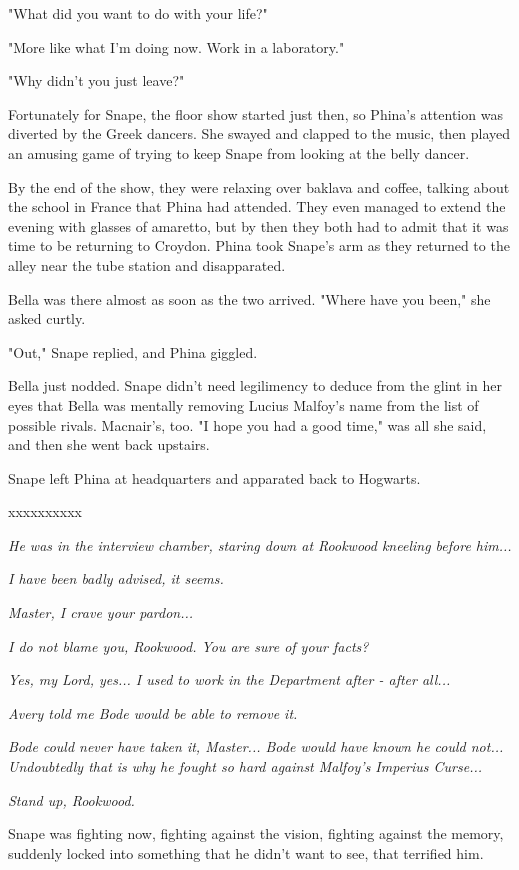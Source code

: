 \documentclass[a4paper,11pt]{article}
\begin{document}
"What did you want to do with your life?"

"More like what I'm doing now. Work in a laboratory."

"Why didn't you just leave?"

Fortunately for Snape, the floor show started just then, so Phina's attention was diverted by the Greek dancers. She swayed and clapped to the music, then played an amusing game of trying to keep Snape from looking at the belly dancer.

By the end of the show, they were relaxing over baklava and coffee, talking about the school in France that Phina had attended. They even managed to extend the evening with glasses of amaretto, but by then they both had to admit that it was time to be returning to Croydon. Phina took Snape's arm as they returned to the alley near the tube station and disapparated.

Bella was there almost as soon as the two arrived. "Where have you been," she asked curtly.

"Out," Snape replied, and Phina giggled.

Bella just nodded. Snape didn't need legilimency to deduce from the glint in her eyes that Bella was mentally removing Lucius Malfoy's name from the list of possible rivals. Macnair's, too. "I hope you had a good time," was all she said, and then she went back upstairs.

Snape left Phina at headquarters and apparated back to Hogwarts.

xxxxxxxxxx

\emph{He was in the interview chamber, staring down at Rookwood kneeling before him...}

\emph{I have been badly advised, it seems.}

\emph{Master, I crave your pardon...}

\emph{I do not blame you, Rookwood. You are sure of your facts?}

\emph{Yes, my Lord, yes... I used to work in the Department after - after all...}

\emph{Avery told me Bode would be able to remove it.}

\emph{Bode could never have taken it, Master... Bode would have known he could not... Undoubtedly that is why he fought so hard against Malfoy's Imperius Curse...}

\emph{Stand up, Rookwood.}

Snape was fighting now, fighting against the vision, fighting against the memory, suddenly locked into something that he didn't want to see, that terrified him.
\end{document}
